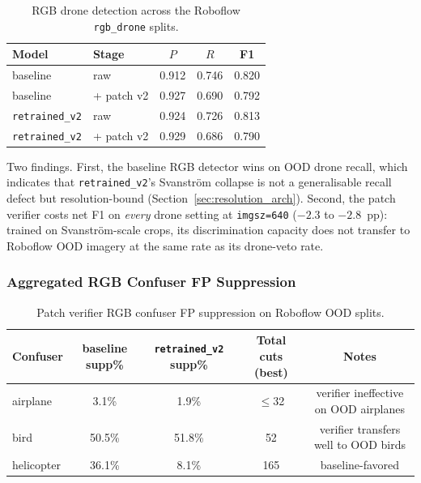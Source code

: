 \begin{table}[htbp]
    \centering
    \caption{RGB drone detection across the Roboflow \texttt{rgb\_drone} splits.}
    \label{tab:ood_rgb_drone}
    \begin{tabular}{llccc}
        \toprule
        Model & Stage & $P$ & $R$ & F1 \\
        \midrule
        baseline      & raw           & 0.912 & 0.746 & 0.820 \\
        baseline      & + patch v2    & 0.927 & 0.690 & 0.792 \\
        \texttt{retrained\_v2}  & raw           & 0.924 & 0.726 & 0.813 \\
        \texttt{retrained\_v2}  & + patch v2    & 0.929 & 0.686 & 0.790 \\
        \bottomrule
    \end{tabular}
\end{table}

Two findings. First, the baseline RGB detector wins on OOD drone recall, which indicates that \texttt{retrained\_v2}'s Svanstr\"om collapse is not a generalisable recall defect but resolution-bound (Section~\ref{sec:resolution_arch}). Second, the patch verifier costs net F1 on \emph{every} drone setting at \texttt{imgsz=640} ($-2.3$ to $-2.8$~pp): trained on Svanstr\"om-scale crops, its discrimination capacity does not transfer to Roboflow OOD imagery at the same rate as its drone-veto rate.

\subsubsection{Aggregated RGB Confuser FP Suppression}

\begin{table}[htbp]
    \centering
    \caption{Patch verifier RGB confuser FP suppression on Roboflow OOD splits.}
    \label{tab:ood_rgb_confuser}
    \begin{tabular}{lcccc}
        \toprule
        Confuser & baseline supp\% & \texttt{retrained\_v2} supp\% & Total cuts (best) & Notes \\
        \midrule
        airplane   &  3.1\% &  1.9\% &  $\leq$32 & verifier ineffective on OOD airplanes \\
        bird       & 50.5\% & 51.8\% & 52 & verifier transfers well to OOD birds \\
        helicopter & 36.1\% &  8.1\% & 165 & baseline-favored \\
        \bottomrule
    \end{tabular}
\end{table}


